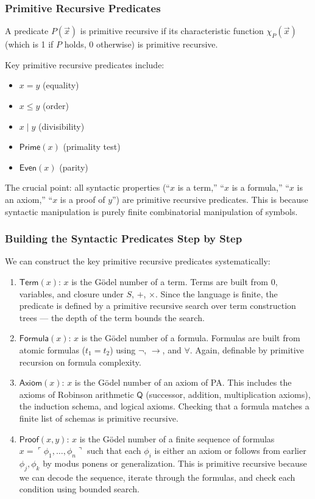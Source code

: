 \subsubsection*{Primitive Recursive Predicates}

A predicate $P(\vec{x})$ is primitive recursive if its characteristic function $\chi_P(\vec{x})$ (which is 1 if $P$ holds, 0 otherwise) is primitive recursive.

Key primitive recursive predicates include:
\begin{itemize}
\item $x = y$ (equality)
\item $x \le y$ (order)
\item $x \mid y$ (divisibility)
\item $\mathsf{Prime}(x)$ (primality test)
\item $\mathsf{Even}(x)$ (parity)
\end{itemize}

The crucial point: all syntactic properties (``$x$ is a term,'' ``$x$ is a formula,'' ``$x$ is an axiom,'' ``$x$ is a proof of $y$'') are primitive recursive predicates. This is because syntactic manipulation is purely finite combinatorial manipulation of symbols.

\subsubsection*{Building the Syntactic Predicates Step by Step}

We can construct the key primitive recursive predicates systematically:

\begin{enumerate}
\item $\mathsf{Term}(x)$: $x$ is the Gödel number of a term. Terms are built from $0$, variables, and closure under $S$, $+$, $\times$. Since the language is finite, the predicate is defined by a primitive recursive search over term construction trees --- the depth of the term bounds the search.

\item $\mathsf{Formula}(x)$: $x$ is the Gödel number of a formula. Formulas are built from atomic formulas ($t_1 = t_2$) using $\neg$, $\to$, and $\forall$. Again, definable by primitive recursion on formula complexity.

\item $\mathsf{Axiom}(x)$: $x$ is the Gödel number of an axiom of PA. This includes the axioms of Robinson arithmetic $\mathsf{Q}$ (successor, addition, multiplication axioms), the induction schema, and logical axioms. Checking that a formula matches a finite list of schemas is primitive recursive.

\item $\mathsf{Proof}(x, y)$: $x$ is the Gödel number of a finite sequence of formulas $x = \ulcorner \phi_1, \dots, \phi_n \urcorner$ such that each $\phi_i$ is either an axiom or follows from earlier $\phi_j, \phi_k$ by modus ponens or generalization. This is primitive recursive because we can decode the sequence, iterate through the formulas, and check each condition using bounded search.
\end{enumerate}

